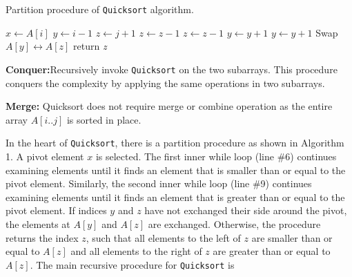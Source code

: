\documentclass[a4paper, 10pt,twocolumn]{article}
\begin{document}
\begin{algorithm}
  \caption{Partition procedure of \texttt{Quicksort} \newline
algorithm.}
  \label{algo:ins_sort1}
  \begin{algorithmic}[1]
     \newline
      \newline
      \State $x \leftarrow A[i]$
      \State $y \leftarrow i - 1$
      \State $z \leftarrow j + 1$
          \State $z \leftarrow z - 1$ 
          \State $z \leftarrow z - 1$ 
          \EndWhile
          \State $y \leftarrow y + 1$ 
          \State $y \leftarrow y + 1$ 
          \EndWhile 
            \State Swap $A[y]\leftrightarrow A[z]$
           \Else
          \State  return \textit{z} 
          \EndIf
          
               \EndWhile
      \EndProcedure 
  \end{algorithmic}
\end{algorithm} \newline

\noindent \textbf{Conquer:}Recursively invoke \texttt{Quicksort} on the two subarrays. This procedure conquers the complexity by applying the same operations in two subarrays. \vspace{5pt}

\noindent \textbf{Merge:} Quicksort does not require merge or combine operation as the entire array \textit{$A[i..j]$} is sorted in place.

 In the heart of \texttt{Quicksort}, there is a partition
procedure as shown in Algorithm 1. A pivot element
$x$ is selected. The first inner while loop (line
\#6) continues examining elements until it finds an
element that is smaller than or equal to the pivot element.
Similarly, the second inner while loop (line
\#9) continues examining elements until it finds an
element that is greater than or equal to the pivot
element. If indices $y$ and $z$ have not exchanged
their side around the pivot, the elements at $A[y]$
and $A[z]$ are exchanged. Otherwise, the procedure
returns the index $z$, such that all elements to the
left of $z$ are smaller than or equal to $A[z]$ and all
elements to the right of $z$ are greater than or equal
to $A[z]$.\newline
\hspace*{5pt} The main recursive procedure for \texttt{Quicksort} is
\vspace{0.5cm}
\end{document}
